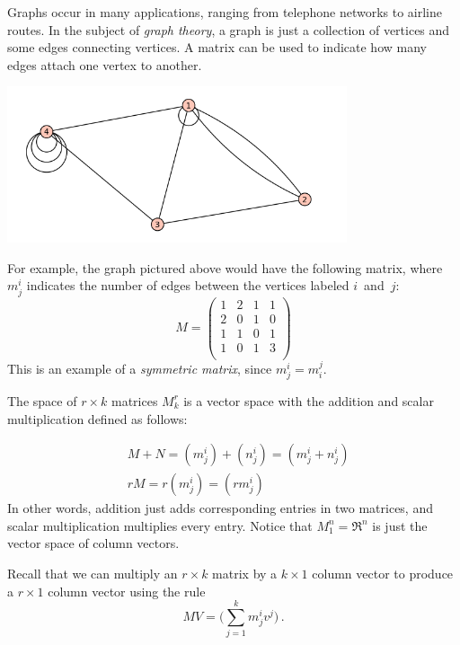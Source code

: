 
\begin{example}
Graphs occur in many applications, ranging from telephone networks to airline routes.  In the subject of \emph{graph theory}, a graph is just a collection of vertices and some edges connecting vertices.  A matrix can be used to indicate how many edges attach one vertex to another.

\begin{center}
\includegraphics[width=10cm]{notes8-0.png}
\end{center}
For example, the graph pictured above would have the following matrix, where $m^i_j$ indicates the number of edges between the vertices labeled $i$~and~$j$:
\[
M = \begin{pmatrix}
1 & 2 & 1 & 1 \\
2 & 0 & 1 & 0 \\
1 & 1 & 0 & 1 \\
1 & 0 & 1 & 3 \\
\end{pmatrix}
\]
This is an example of a \emph{symmetric matrix}, since $m_j^i = m_i^j$.
\end{example}

The space of $r\times k$ matrices $M_k^r$ is a vector space with the addition and scalar multiplication defined as follows:

\begin{align*}
&M+N = (m_j^i) + (n_j^i) = ( m_j^i + n_j^i ) \\
&rM = r(m_j^i) = (rm_j^i)
\end{align*}
In other words, addition just adds corresponding entries in two matrices, and scalar multiplication multiplies every entry.
Notice that $M_1^n = \Re^n$ is just the vector space of column vectors.

Recall that we can multiply an \(r \times k\) matrix by a \(k \times 1\) column vector to produce a \(r \times 1\) column vector using the rule
\[MV = \big(\sum_{j=1}^k m_j^i v^j\big)\, .\]

